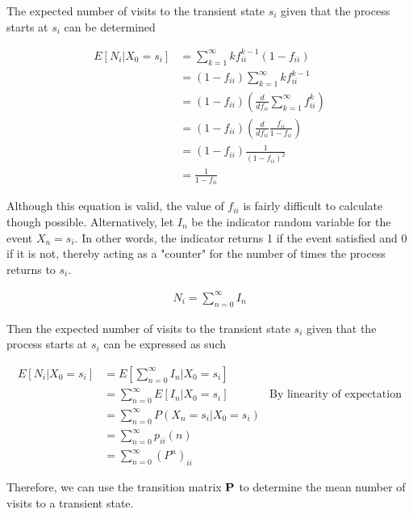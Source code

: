 \documentclass[a4paper,12pt]{article}
\theoremstyle{definition}
\let\oldtextbf\mathbf
\renewcommand{\mathbf}[1]{\oldtextbf{\boldmath #1}}
\begin{document}
	The expected number of visits to the transient state $s_i$ given that the process starts at $s_i$ can be determined
	
	\begin{equation*}
		\begin{aligned}
			E[N_i|X_0 = s_i] &= \sum_{k=1}^\infty kf_{ii}^{k-1}(1-f_{ii}) \\
							&= (1-f_{ii})\sum_{k=1}^\infty kf_{ii}^{k-1} \\
							&= (1-f_{ii}) (\frac{d}{df_{ii}} \sum_{k=1}^\infty f_{ii}^{k}) \\
							&= (1-f_{ii}) (\frac{d}{df_{ii}} \frac{f_{ii}}{1-f_{ii}}) \\
							&= (1-f_{ii}) \frac{1}{(1-f_{ii})^2} \\
							&= \frac{1}{1-f_{ii}}\
		\end{aligned}
	\end{equation*}	
	
	Although this equation is valid, the value of $f_{ii}$ is fairly difficult to calculate though possible. Alternatively, let $I_n$ be the indicator random variable for the event $X_n=s_i$. In other words, the indicator returns 1 if the event satisfied and 0 if it is not, thereby acting as a "counter" for the number of times the process returns to $s_i$.
	
	\begin{equation*}
	\begin{aligned}
		 N_i = \sum_{n=0}^\infty I_n
	\end{aligned}
	\end{equation*}	
	
	 Then the expected number of visits to the transient state $s_i$ given that the process starts at $s_i$ can be expressed as such
	
	\begin{equation*}
	\begin{aligned}
		 E[N_i|X_0 = s_i] &= E\left[\sum_{n=0}^\infty I_n | X_0 = s_i\right] \\
		 				  &= \sum_{n=0}^\infty E\left[I_n | X_0 = s_i\right] &\text{By linearity of expectation}\\
		 				  &= \sum_{n=0}^\infty P(X_n = s_i | X_0 = s_i) \\
		 				  &= \sum_{n=0}^\infty p_{ii}(n) \\
		 				  &= \sum_{n=0}^\infty (P^n)_{ii}
	\end{aligned}
	\end{equation*}	
	
Therefore, we can use the transition matrix $\mathbf{P}$ to determine the mean number of visits to a transient state.
\end{document}
